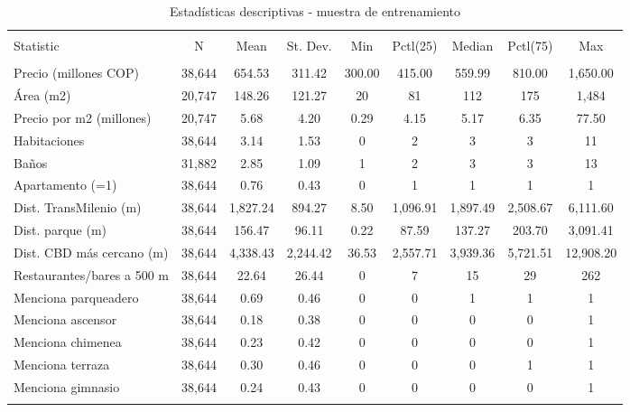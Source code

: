 
\begin{table}[!htbp] \centering 
  \caption{Estadísticas descriptivas - muestra de entrenamiento} 
  \label{} 
\begin{tabular}{@{\extracolsep{5pt}}lcccccccc} 
\\[-1.8ex]\hline 
\hline \\[-1.8ex] 
Statistic & \multicolumn{1}{c}{N} & \multicolumn{1}{c}{Mean} & \multicolumn{1}{c}{St. Dev.} & \multicolumn{1}{c}{Min} & \multicolumn{1}{c}{Pctl(25)} & \multicolumn{1}{c}{Median} & \multicolumn{1}{c}{Pctl(75)} & \multicolumn{1}{c}{Max} \\ 
\hline \\[-1.8ex] 
Precio (millones COP) & 38,644 & 654.53 & 311.42 & 300.00 & 415.00 & 559.99 & 810.00 & 1,650.00 \\ 
Área (m2) & 20,747 & 148.26 & 121.27 & 20 & 81 & 112 & 175 & 1,484 \\ 
Precio por m2 (millones) & 20,747 & 5.68 & 4.20 & 0.29 & 4.15 & 5.17 & 6.35 & 77.50 \\ 
Habitaciones & 38,644 & 3.14 & 1.53 & 0 & 2 & 3 & 3 & 11 \\ 
Baños & 31,882 & 2.85 & 1.09 & 1 & 2 & 3 & 3 & 13 \\ 
Apartamento (=1) & 38,644 & 0.76 & 0.43 & 0 & 1 & 1 & 1 & 1 \\ 
Dist. TransMilenio (m) & 38,644 & 1,827.24 & 894.27 & 8.50 & 1,096.91 & 1,897.49 & 2,508.67 & 6,111.60 \\ 
Dist. parque (m) & 38,644 & 156.47 & 96.11 & 0.22 & 87.59 & 137.27 & 203.70 & 3,091.41 \\ 
Dist. CBD más cercano (m) & 38,644 & 4,338.43 & 2,244.42 & 36.53 & 2,557.71 & 3,939.36 & 5,721.51 & 12,908.20 \\ 
Restaurantes/bares a 500 m & 38,644 & 22.64 & 26.44 & 0 & 7 & 15 & 29 & 262 \\ 
Menciona parqueadero & 38,644 & 0.69 & 0.46 & 0 & 0 & 1 & 1 & 1 \\ 
Menciona ascensor & 38,644 & 0.18 & 0.38 & 0 & 0 & 0 & 0 & 1 \\ 
Menciona chimenea & 38,644 & 0.23 & 0.42 & 0 & 0 & 0 & 0 & 1 \\ 
Menciona terraza & 38,644 & 0.30 & 0.46 & 0 & 0 & 0 & 1 & 1 \\ 
Menciona gimnasio & 38,644 & 0.24 & 0.43 & 0 & 0 & 0 & 0 & 1 \\ 
\hline \\[-1.8ex] 
\end{tabular} 
\end{table} 
